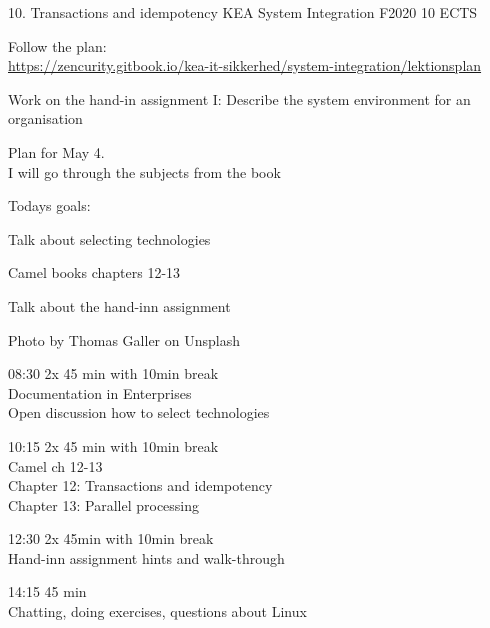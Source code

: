 \documentclass[Screen16to9,17pt]{foils}
\begin{document}
\mytitlepage
{10. Transactions and idempotency}
{KEA System Integration F2020 10 ECTS}



\begin{list2}
\item Follow the plan:\\
\url{https://zencurity.gitbook.io/kea-it-sikkerhed/system-integration/lektionsplan}
\item Work on the hand-in assignment I: Describe the system environment for an organisation
\item Plan for May 4.\\
I will go through the subjects from the book
\item
\end{list2}



Todays goals:
\begin{list2}
\item Talk about selecting technologies
\item Camel books chapters 12-13
\item Talk about the hand-inn assignment
\end{list2}

Photo by Thomas Galler on Unsplash


\begin{list2}
\item 08:30 2x 45 min with 10min break\\
Documentation in Enterprises\\
Open discussion how to select technologies
\item 10:15 2x 45 min with 10min break\\
Camel ch 12-13\\
Chapter 12: Transactions and idempotency\\
Chapter 13: Parallel processing
\item 12:30 2x 45min with 10min break \\
Hand-inn assignment hints and walk-through
\item 14:15 45 min\\
Chatting, doing exercises, questions about Linux
\end{list2}




\end{document}

